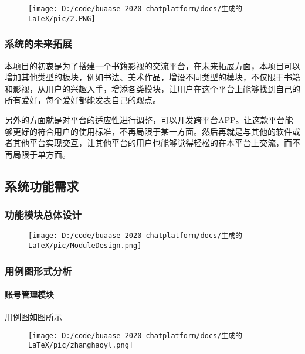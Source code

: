 \documentclass[
]{article}
\begin{document}
\begin{figure}
\centering
\texttt{[image: D:/code/buaase-2020-chatplatform/docs/生成的LaTeX/pic/2.PNG]}
\caption{}
\end{figure}

\hypertarget{header-n105}{%
\subsubsection{系统的未来拓展}\label{header-n105}}

本项目的初衷是为了搭建一个书籍影视的交流平台，在未来拓展方面，本项目可以增加其他类型的板块，例如书法、美术作品，增设不同类型的模块，不仅限于书籍和影视，从用户的兴趣入手，增添各类模块，让用户在这个平台上能够找到自己的所有爱好，每个爱好都能发表自己的观点。

另外的方面就是对平台的适应性进行调整，可以开发跨平台APP。让这款平台能够更好的符合用户的使用标准，不再局限于某一方面。然后再就是与其他的软件或者其他平台实现交互，让其他平台的用户也能够觉得轻松的在本平台上交流，而不再局限于单方面。

\hypertarget{header-n108}{%
\subsection{系统功能需求}\label{header-n108}}

\hypertarget{header-n109}{%
\subsubsection{功能模块总体设计}\label{header-n109}}

\begin{figure}
\centering
\texttt{[image: D:/code/buaase-2020-chatplatform/docs/生成的LaTeX/pic/ModuleDesign.png]}
\caption{}
\end{figure}

\hypertarget{header-n111}{%
\subsubsection{用例图形式分析}\label{header-n111}}

\hypertarget{header-n112}{%
\paragraph{账号管理模块}\label{header-n112}}

用例图如图所示

\begin{figure}
\centering
\texttt{[image: D:/code/buaase-2020-chatplatform/docs/生成的LaTeX/pic/zhanghaoyl.png]}
\caption{}
\end{figure}
\end{document}
